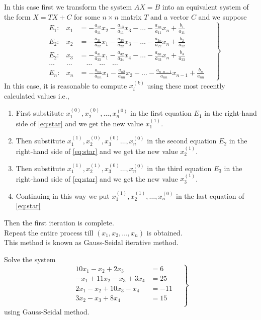 \documentclass[12pt,class=book,crop=false]{standalone}
\begin{document}
In this case first we transform the system \( AX=B \) into an equivalent system of the form \( X=TX+C \) for some \( n\times n \) matrix \( T \) and a vector \( C \) and we suppose
    \begin{equation}
        \left.\begin{aligned}
            &E_1:&x_1&= -\frac{a_{12}}{a_{11}}x_2-\frac{a_{13}}{a_{11}}x_3-\dots-\frac{a_{1n}}{a_{11}}x_n+\frac{b_1}{a_{11}}\\
            &E_2:&x_2&= -\frac{a_{21}}{a_{22}}x_1-\frac{a_{23}}{a_{22}}x_3-\dots-\frac{a_{2n}}{a_{22}}x_n+\frac{b_2}{a_{22}}\\
            &E_2:&x_3&= -\frac{a_{31}}{a_{33}}x_1-\frac{a_{32}}{a_{34}}x_4-\dots-\frac{a_{3n}}{a_{33}}x_n+\frac{b_3}{a_{33}}\\
            &\dots &\dots &\quad \dots\quad \dots\quad \dots\\
            &E_n:&x_n&= -\frac{a_{na}}{a_{nn}}x_1-\frac{a_{n2}}{a_{nn}}x_2-\dots-\frac{a_{n\cdot n-1}}{a_{nn}}x_{n-1}+\frac{b_n}{a_{nn}}
        \end{aligned}\quad\right\} \label{eq:star}
    \end{equation}
    In this case, it is reasonable to compute \( x_i^{(k)} \) using these most recently calculated values i.e.,
    \begin{enumerate}
        \item First substitute \( x_1^{(0)},x_2^{(0)},\dots,x_n^{(0)} \) in the first equation \( E_1 \) in the right-hand side of \eqref{eq:star} and we get the new value \( x_1^{(1)} \).
        \item Then substitute \( x_1^{(1)},x_2^{(0)},x_3^{(0)}\dots,x_n^{(0)} \) in the second equation \( E_2 \) in the right-hand side of \eqref{eq:star} and we get the new value \( x_2^{(1)} \).
        \item Then substitute \( x_1^{(1)},x_2^{(1)},x_3^{(0)}\dots,x_n^{(0)} \) in the third equation \( E_3 \) in the right-hand side of \eqref{eq:star} and we get the new value \( x_3^{(1)} \).
        \item Continuing in this way we put \( x_1^{(1)},x_2^{(1)},\dots,x_n^{(0)} \) in the last equation of \eqref{eq:star}
    \end{enumerate}
    Then the first iteration is complete.\\
    Repeat the entire process till \( (x_1,x_2,\dots,x_n) \) is obtained.\\
    This method is known as Gauss-Seidal iterative method.
    \begin{prob}
        Solve the system
        \begin{equation}
            \left.\begin{aligned}
                10x_1-x_2+2x_3&=6\\
                -x_1+11x_2-x_3+3x_4&=25\\
                2x_1-x_2+10x_3-x_4&=-11\\
                3x_2-x_3+8x_4&=15\\
            \end{aligned}\quad\right\}\label{eq:star1}
        \end{equation}
        using Gauss-Seidal method.
    \end{prob}
\end{document}
